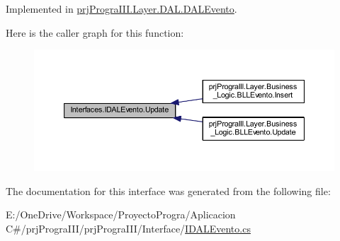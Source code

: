 Implemented in \hyperlink{classprj_progra_i_i_i_1_1_layer_1_1_d_a_l_1_1_d_a_l_evento_a173c20de2fec58a207baa8204cbcaefd}{prj\+Progra\+I\+I\+I.\+Layer.\+D\+A\+L.\+D\+A\+L\+Evento}.

Here is the caller graph for this function\+:
\nopagebreak
\begin{figure}[H]
\begin{center}
\leavevmode
\includegraphics[width=350pt]{interface_interfaces_1_1_i_d_a_l_evento_a891007642c180aaf3224fd217361bd7b_icgraph}
\end{center}
\end{figure}


The documentation for this interface was generated from the following file\+:\begin{DoxyCompactItemize}
\item 
E\+:/\+One\+Drive/\+Workspace/\+Proyecto\+Progra/\+Aplicacion C\#/prj\+Progra\+I\+I\+I/prj\+Progra\+I\+I\+I/\+Interface/\hyperlink{_i_d_a_l_evento_8cs}{I\+D\+A\+L\+Evento.\+cs}\end{DoxyCompactItemize}
